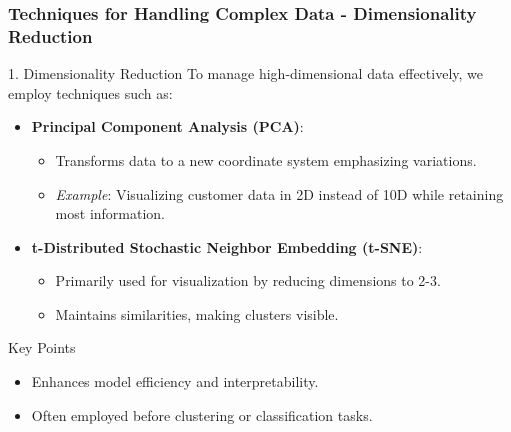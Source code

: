 \documentclass[aspectratio=169]{beamer}
\begin{document}
\begin{frame}[fragile]
    \frametitle{Techniques for Handling Complex Data - Dimensionality Reduction}
    \begin{block}{1. Dimensionality Reduction}
        To manage high-dimensional data effectively, we employ techniques such as:
        \begin{itemize}
            \item \textbf{Principal Component Analysis (PCA)}: 
            \begin{itemize}
                \item Transforms data to a new coordinate system emphasizing variations.
                \item \textit{Example}: Visualizing customer data in 2D instead of 10D while retaining most information.
            \end{itemize}
            \item \textbf{t-Distributed Stochastic Neighbor Embedding (t-SNE)}: 
            \begin{itemize}
                \item Primarily used for visualization by reducing dimensions to 2-3.
                \item Maintains similarities, making clusters visible.
            \end{itemize}
        \end{itemize}
    \end{block}
    \begin{block}{Key Points}
        \begin{itemize}
            \item Enhances model efficiency and interpretability.
            \item Often employed before clustering or classification tasks.
        \end{itemize}
    \end{block}
\end{frame}
\end{document}
